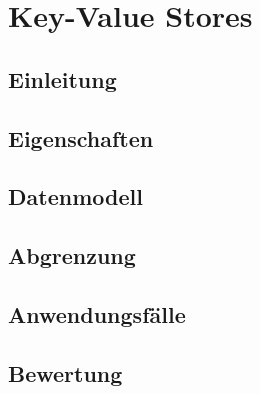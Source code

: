 \section{Key-Value Stores}
\subsection{Einleitung}
\subsection{Eigenschaften}
\subsection{Datenmodell}
\subsection{Abgrenzung}
\subsection{Anwendungsfälle}
\subsection{Bewertung}
